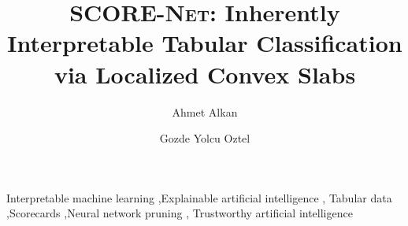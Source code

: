 \documentclass[5p,10pt]{elsarticle}
\newcommand{\modelname}{\textsc{SCORE-Net}}
\begin{document}
\begin{frontmatter}

\title{\modelname: Inherently Interpretable Tabular Classification via
Localized Convex Slabs}

\author[a]{Ahmet Alkan}
\author[a]{Gozde Yolcu Oztel}
\address[a]{Department of Software Engineering, Faculty of Computer and
Information Sciences, Sakarya University, Esentepe Campus, 54187 Serdivan,
Sakarya, Turkey}

\begin{abstract}

\end{abstract}

\begin{keyword}
Interpretable machine learning \sep Explainable artificial intelligence \sep
Tabular data \sep Scorecards \sep Neural network pruning \sep
Trustworthy artificial intelligence
\end{keyword}

\end{frontmatter}













\setlength{\bibsep}{0pt}
\renewcommand{\bibfont}{\small}


\end{document}
